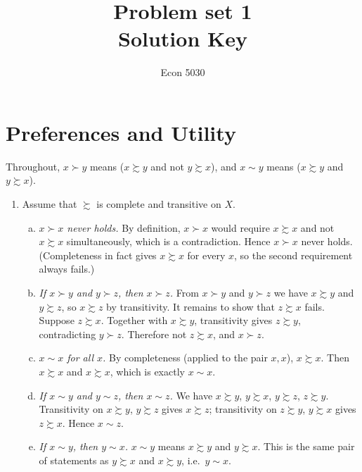 \documentclass[12pt]{article}
\title{Problem set 1 \\ \large Solution Key}
\author{Econ 5030}
\date{}
\newcommand{\pref}{\succsim}
\begin{document}
\maketitle

\section{Preferences and Utility}

Throughout, $x \succ y$ means ($x \pref y$ and not $y \pref x$), and $x \sim y$ means ($x \pref y$ and $y \pref x$).

\begin{enumerate}

\item Assume that $\pref$ is complete and transitive on $X$.

\begin{enumerate}[(a)]
\item \emph{$x \succ x$ never holds.}
By definition, $x \succ x$ would require $x \pref x$ and not $x \pref x$ simultaneously, which is a contradiction. Hence $x \succ x$ never holds. (Completeness in fact gives $x \pref x$ for every $x$, so the second requirement always fails.)

\item \emph{If $x \succ y$ and $y \succ z$, then $x \succ z$.}
From $x \succ y$ and $y \succ z$ we have $x \pref y$ and $y \pref z$, so $x \pref z$ by transitivity. It remains to show that $z \pref x$ fails. Suppose $z \pref x$. Together with $x \pref y$, transitivity gives $z \pref y$, contradicting $y \succ z$. Therefore not $z \pref x$, and $x \succ z$.

\item \emph{$x \sim x$ for all $x$.}
By completeness (applied to the pair $x,x$), $x \pref x$. Then $x \pref x$ and $x \pref x$, which is exactly $x \sim x$.

\item \emph{If $x \sim y$ and $y \sim z$, then $x \sim z$.}
We have $x \pref y$, $y \pref x$, $y \pref z$, $z \pref y$. Transitivity on $x \pref y$, $y \pref z$ gives $x \pref z$; transitivity on $z \pref y$, $y \pref x$ gives $z \pref x$. Hence $x \sim z$.

\item \emph{If $x \sim y$, then $y \sim x$.}
$x \sim y$ means $x \pref y$ and $y \pref x$. This is the same pair of statements as $y \pref x$ and $x \pref y$, i.e.\ $y \sim x$.


\end{enumerate}
\end{enumerate}
\end{document}
